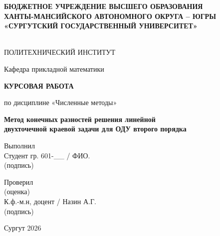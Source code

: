 \documentclass[14pt,a4paper]{extarticle}  %
\numberwithin{equation}{section}
\begin{document}
\begin{titlepage}
    \begin{center}
        \textbf{БЮДЖЕТНОЕ УЧРЕЖДЕНИЕ ВЫСШЕГО ОБРАЗОВАНИЯ}\\
        \textbf{ХАНТЫ-МАНСИЙСКОГО АВТОНОМНОГО ОКРУГА -- ЮГРЫ}\\
        \textbf{«СУРГУТСКИЙ ГОСУДАРСТВЕННЫЙ УНИВЕРСИТЕТ»}
        
        \underline{\hspace{15cm}}\\

        \vspace{0.8cm}
        ПОЛИТЕХНИЧЕСКИЙ ИНСТИТУТ
        
        \vspace{0.2cm}
        Кафедра прикладной математики
        
        \vspace{2.5cm}
        \textbf{КУРСОВАЯ РАБОТА}
        
        \vspace{0.3cm}
        по дисциплине «Численные методы»
        
        \vspace{0.5cm}
        {\large \textbf{Метод конечных разностей решения линейной}} \\
        {\large \textbf{двухточечной краевой задачи для ОДУ второго порядка}}
    \end{center}
    
    \vspace{1.5cm}
    \begin{flushright}
        \begin{minipage}{0.6\textwidth}
            \raggedright
            Выполнил \\
            Студент гр. 601-\_\_ \hspace{0.8cm} \underline{\hspace{2cm}} \hspace{0.5cm} / ФИО. \\
            \hfill (подпись)
            
            \vspace{0.8cm}
            Проверил \\
            \underline{\hspace{3cm}} \hspace{0.8cm} (оценка) \\
            К.ф.-м.н, доцент \hspace{0.8cm} \underline{\hspace{2cm}} \hspace{0.3cm} / Назин А.Г. \\
            \hfill (подпись)
        \end{minipage}
    \end{flushright}
    
    \vfill
    \begin{center}
        Сургут 2026
    \end{center}
\end{titlepage}
\end{document}

